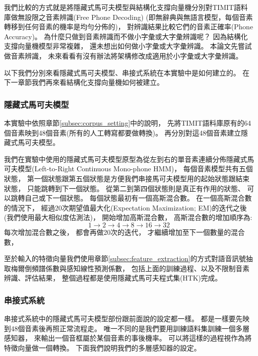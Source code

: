   我們比較的方式就是將隱藏式馬可夫模型與結構化支撐向量機分別對TIMIT語料庫做無設限之音素辨識(Free Phone Decoding)
  (即無辭典與無語言模型，每個音素轉移到任何音素的機率是均勻分佈的)，
  對辨識結果比較它們的音素正確率(Phone Accuracy)。
  為什麼只做到音素辨識而不做小字彙或大字彙辨識呢？
  因為結構化支撐向量機模型非常複雜，
  還未想出如何做小字彙或大字彙辨識。
  本論文先嘗試做音素辨識，
  未來看看有沒有辦法將架構修改成適用於小字彙或大字彙辨識。

  以下我們分別來看隱藏式馬可夫模型、串接式系統在本實驗中是如何建立的。
  在下一章節我們再來看結構化支撐向量機如何被建立。
  
  \subsubsection{隱藏式馬可夫模型}
    本實驗中依照章節\ref{subsec:corpus_setting}中的說明，
    先將TIMIT語料庫原有的64個音素映到48個音素(所有的人工轉寫都要做轉換)。
    再分別對這48個音素建立隱藏式馬可夫模型。

    我們在實驗中使用的隱藏式馬可夫模型原型為從左到右的單音素連續分佈隱藏式馬可夫模型(Left-to-Right Continuous Mono-phone HMM)，
    每個音素模型共有五個狀態，
    第一個狀態跟第五個狀態是方便我們串接馬可夫模型用的起始狀態跟結束狀態，
    只能跳轉到下一個狀態。
    從第二到第四個狀態則是真正有作用的狀態、
    可以跳轉自己或下一個狀態。
    每個狀態最初有一個高斯混合數。
    在一個高斯混合數的情況下，
    經過20次期望值最大化(Expectation Maximization; EM)的迭代之後(我們使用最大相似度估測法)，
    開始增加高斯混合數，
    高斯混合數的增加順序為:
    \begin{equation*}
      1 \rightarrow 2 \rightarrow 4 \rightarrow 8 \rightarrow 16 \rightarrow 32
    \end{equation*}
    每次增加混合數之後，
    都會再做20次的迭代，
    才繼續增加至下一個數量的混合數，

    至於輸入的特徵向量我們使用章節\ref{subsec:feature_extraction}的方式對語音訊號抽取梅爾倒頻譜係數與感知線性預測係數，
    包括上面的訓練過程、以及不限制音素辨識、評估結果，
    整個過程都是使用隱藏式馬可夫程式集(HTK)完成。

  \subsubsection{串接式系統}
    串接式系統中的隱藏式馬可夫模型部份跟前面說的設定都一樣。 
    都是一樣要先映到48個音素後再照正常流程走。
    唯一不同的是我們要用訓練語料集訓練一個多層感知器，
    來輸出一個音框屬於某個音素的事後機率。
    可以將這樣的過程視作為將特徵向量做一個轉換。
    下面我們說明我們的多層感知器的設定。

